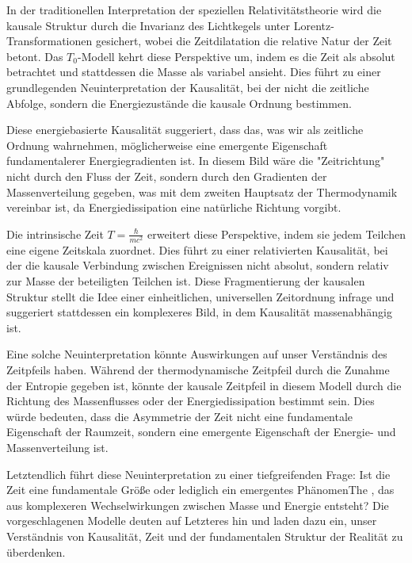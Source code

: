 \documentclass[a4paper,12pt]{article}
\begin{document}
	In der traditionellen Interpretation der speziellen Relativitätstheorie wird die kausale Struktur durch die Invarianz des Lichtkegels unter Lorentz-Transformationen gesichert, wobei die Zeitdilatation die relative Natur der Zeit betont. Das \( T_0 \)-Modell kehrt diese Perspektive um, indem es die Zeit als absolut betrachtet und stattdessen die Masse als variabel ansieht. Dies führt zu einer grundlegenden Neuinterpretation der Kausalität, bei der nicht die zeitliche Abfolge, sondern die Energiezustände die kausale Ordnung bestimmen.
	
	Diese energiebasierte Kausalität suggeriert, dass das, was wir als zeitliche Ordnung wahrnehmen, möglicherweise eine emergente Eigenschaft fundamentalerer Energiegradienten ist. In diesem Bild wäre die "Zeitrichtung" nicht durch den Fluss der Zeit, sondern durch den Gradienten der Massenverteilung gegeben, was mit dem zweiten Hauptsatz der Thermodynamik vereinbar ist, da Energiedissipation eine natürliche Richtung vorgibt.
	
	Die intrinsische Zeit \( T = \frac{\hbar}{m c^2} \) erweitert diese Perspektive, indem sie jedem Teilchen eine eigene Zeitskala zuordnet. Dies führt zu einer relativierten Kausalität, bei der die kausale Verbindung zwischen Ereignissen nicht absolut, sondern relativ zur Masse der beteiligten Teilchen ist. Diese Fragmentierung der kausalen Struktur stellt die Idee einer einheitlichen, universellen Zeitordnung infrage und suggeriert stattdessen ein komplexeres Bild, in dem Kausalität massenabhängig ist.
	
	Eine solche Neuinterpretation könnte Auswirkungen auf unser Verständnis des Zeitpfeils haben. Während der thermodynamische Zeitpfeil durch die Zunahme der Entropie gegeben ist, könnte der kausale Zeitpfeil in diesem Modell durch die Richtung des Massenflusses oder der Energiedissipation bestimmt sein. Dies würde bedeuten, dass die Asymmetrie der Zeit nicht eine fundamentale Eigenschaft der Raumzeit, sondern eine emergente Eigenschaft der Energie- und Massenverteilung ist.
	
	Letztendlich führt diese Neuinterpretation zu einer tiefgreifenden Frage: Ist die Zeit eine fundamentale Größe oder lediglich ein emergentes PhänomenThe , das aus komplexeren Wechselwirkungen zwischen Masse und Energie entsteht? Die vorgeschlagenen Modelle deuten auf Letzteres hin und laden dazu ein, unser Verständnis von Kausalität, Zeit und der fundamentalen Struktur der Realität zu überdenken.
	
\end{document}
